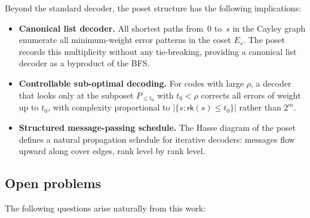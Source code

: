 \documentclass[11pt,twoside,leqno]{article}
\theoremstyle{definition}
\theoremstyle{plain}
\theoremstyle{remark}
\newcommand{\rk}{\mathsf{rk}}
\newcommand{\covrad}{\rho}
\begin{document}
Beyond the standard decoder, the poset structure has the following implications:

\begin{itemize}[itemsep=2pt]
\item \textbf{Canonical list decoder.}
  All shortest paths from~$0$ to~$s$ in the Cayley graph enumerate all minimum-weight
  error patterns in the coset $E_s$. The poset records this multiplicity without any
  tie-breaking, providing a canonical list decoder as a byproduct of the BFS.

\item \textbf{Controllable sub-optimal decoding.}
  For codes with large $\covrad$, a decoder that looks only at the subposet $P_{\le t_0}$
  with $t_0<\covrad$ corrects all errors of weight up to $t_0$, with complexity proportional
  to $|\{s:\rk(s)\le t_0\}|$ rather than $2^m$.

\item \textbf{Structured message-passing schedule.}
  The Hasse diagram of the poset defines a natural propagation schedule for iterative decoders:
  messages flow upward along cover edges, rank level by rank level.
\end{itemize}

\subsection{Open problems}

The following questions arise naturally from this work:
\end{document}
